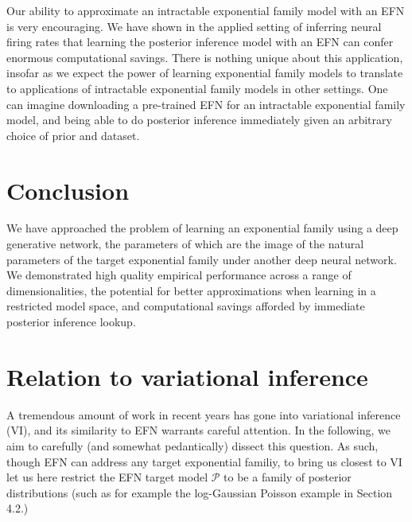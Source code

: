 \documentclass{article}
\begin{document}
Our ability to approximate an intractable exponential family model with an EFN is very encouraging.  We have shown in the applied setting of inferring neural firing rates that learning the posterior inference model with an EFN can confer enormous computational savings.  There is nothing unique about this application, insofar as we expect the power of learning exponential family models to translate to applications of intractable exponential family models in other settings.  One can imagine downloading a pre-trained EFN for an intractable exponential family model, and being able to do posterior inference immediately given an arbitrary choice of prior and dataset.

\section{Conclusion}

We have approached the problem of learning an exponential family using a deep generative network, the parameters of which are the image of the natural parameters of the target exponential family under another deep neural network.  We demonstrated high quality empirical performance across a range of dimensionalities, the potential for better approximations when learning in a restricted model space, and computational savings afforded by immediate posterior inference lookup.




\appendix
\section{Relation to variational inference}

A tremendous amount of work in recent years has gone into variational inference (VI), and its similarity to EFN warrants careful attention. 
In the following, we aim to carefully (and somewhat pedantically) dissect this question.  
As such, though EFN can address any target exponential familiy, to bring us closest to VI let us here restrict the EFN target model $\mathcal{P}$ to be a family of posterior distributions (such as for example the log-Gaussian Poisson example in Section 4.2.)
\end{document}
